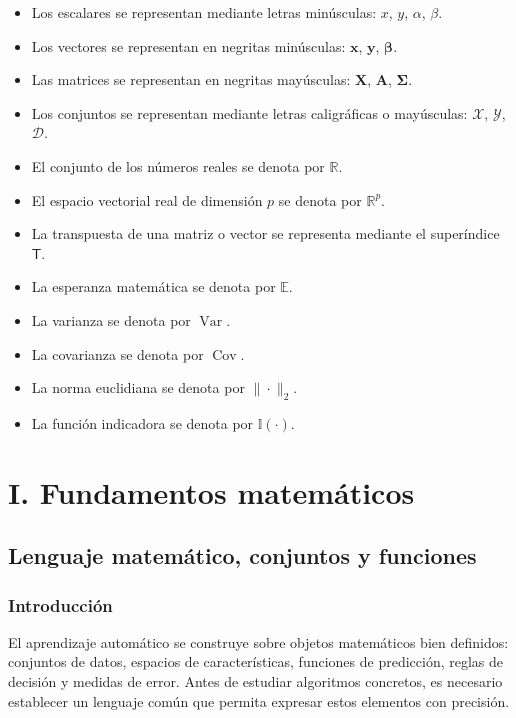 \documentclass[
  spanish,
  11pt,
  letterpaper,
  DIV=11,
  numbers=noendperiod]{scrreprt}
\providecommand{\tightlist}{%
  \setlength{\itemsep}{0pt}\setlength{\parskip}{0pt}}
\theoremstyle{definition}
\theoremstyle{plain}
\theoremstyle{definition}
\theoremstyle{remark}
\begin{document}
\begin{itemize}
\tightlist
\item
  Los escalares se representan mediante letras minúsculas: \(x\), \(y\),
  \(\alpha\), \(\beta\).
\item
  Los vectores se representan en negritas minúsculas: \(\mathbf{x}\),
  \(\mathbf{y}\), \(\boldsymbol{\beta}\).
\item
  Las matrices se representan en negritas mayúsculas: \(\mathbf{X}\),
  \(\mathbf{A}\), \(\boldsymbol{\Sigma}\).
\item
  Los conjuntos se representan mediante letras caligráficas o
  mayúsculas: \(\mathcal{X}\), \(\mathcal{Y}\), \(\mathcal{D}\).
\item
  El conjunto de los números reales se denota por \(\mathbb{R}\).
\item
  El espacio vectorial real de dimensión \(p\) se denota por
  \(\mathbb{R}^{p}\).
\item
  La transpuesta de una matriz o vector se representa mediante el
  superíndice \(\mathsf{T}\).
\item
  La esperanza matemática se denota por \(\mathbb{E}\).
\item
  La varianza se denota por \(\operatorname{Var}\).
\item
  La covarianza se denota por \(\operatorname{Cov}\).
\item
  La norma euclidiana se denota por \(\|\cdot\|_2\).
\item
  La función indicadora se denota por \(\mathbb{I}(\cdot)\).
\end{itemize}

\part{I. Fundamentos matemáticos}

\chapter{Lenguaje matemático, conjuntos y
funciones}\label{sec-conjuntos-funciones}

\section{Introducción}\label{introducciuxf3n-1}

El aprendizaje automático se construye sobre objetos matemáticos bien
definidos: conjuntos de datos, espacios de características, funciones de
predicción, reglas de decisión y medidas de error. Antes de estudiar
algoritmos concretos, es necesario establecer un lenguaje común que
permita expresar estos elementos con precisión.
\end{document}
